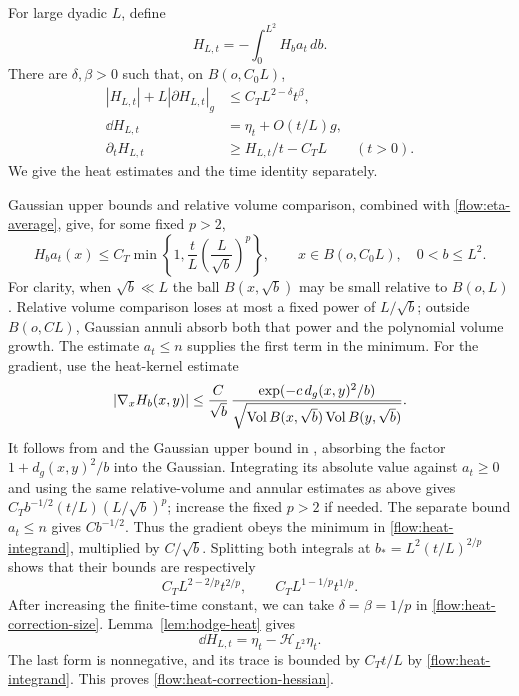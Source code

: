 For large dyadic $L$, define
\[
 H_{L,t}=-\int_0^{L^2}H_ba_t\,db.
\]
There are $\delta,\beta>0$ such that, on $B(o,C_0L)$,
\begin{align}
 |H_{L,t}|+L|\partial H_{L,t}|_g
     &\le C_TL^{2-\delta}t^\beta,
                  \label{flow:heat-correction-size}\\
 \dd H_{L,t}&=\eta_t+O(t/L)g,
                  \label{flow:heat-correction-hessian}\\
 \partial_tH_{L,t}&\ge H_{L,t}/t-C_TL
                  \qquad(t>0).
                  \label{flow:heat-correction-time}
\end{align}
We give the heat estimates and the time identity separately.

Gaussian upper bounds and relative volume comparison, combined with
\eqref{flow:eta-average}, give, for some fixed $p>2$,
\begin{equation}\label{flow:heat-integrand}
 H_ba_t(x)\le
 C_T\min\left\{1,\frac{t}{L}\left(\frac{L}{\sqrt b}\right)^p\right\},
 \qquad x\in B(o,C_0L),\quad0<b\le L^2.
\end{equation}
For clarity, when $\sqrt b\ll L$ the ball $B(x,\sqrt b)$ may be
small relative to $B(o,L)$.  Relative volume comparison loses at
most a fixed power of $L/\sqrt b$; outside $B(o,CL)$, Gaussian
annuli absorb both that power and the polynomial volume growth.
The estimate $a_t\le n$ supplies the first term in the minimum.
For the gradient, use the heat-kernel estimate
\[
 |\nabla_xH_b(x,y)|
 \le \frac{C}{\sqrt b}\,
 \frac{\exp(-c\,d_g(x,y)^2/b)}
 {\sqrt{\operatorname{Vol} B(x,\sqrt b)\operatorname{Vol} B(y,\sqrt b)}}.
\]
It follows from \cite[Theorem~1.3, equation~(1.6)]{SoupletZhang}
and the Gaussian upper bound in \cite[Corollary~3.1]{LiYau},
absorbing the factor $1+d_g(x,y)^2/b$ into the Gaussian.
Integrating its absolute value against $a_t\ge0$ and using the same
relative-volume and annular estimates as above gives
$C_Tb^{-1/2}(t/L)(L/\sqrt b)^p$; increase the fixed $p>2$ if needed.
The separate bound $a_t\le n$ gives $Cb^{-1/2}$.
Thus the gradient obeys the minimum in
\eqref{flow:heat-integrand}, multiplied by $C/\sqrt b$.
Splitting both integrals at
$b_*=L^2(t/L)^{2/p}$ shows that their bounds are respectively
\[
 C_TL^{2-2/p}t^{2/p},\qquad
 C_TL^{1-1/p}t^{1/p}.
\]
After increasing the finite-time constant, we can take
$\delta=\beta=1/p$ in \eqref{flow:heat-correction-size}.
Lemma~\ref{lem:hodge-heat} gives
\[
 \dd H_{L,t}=\eta_t-\mathcal H_{L^2}\eta_t.
\]
The last form is nonnegative, and its trace is bounded by $C_Tt/L$
by \eqref{flow:heat-integrand}.  This proves
\eqref{flow:heat-correction-hessian}.

